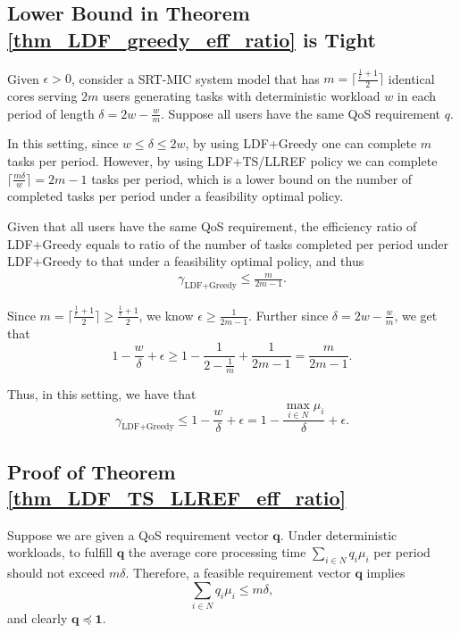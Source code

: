 \documentclass[prodmode,acmtompecs]{acmsmall}
\newcommand{\reqvec}{\mathbf{q}}
\newcommand{\reqscalar}{q}
\newcommand{\fullUserSet}{N}
\begin{document}
\subsection{Lower Bound in Theorem \ref{thm_LDF_greedy_eff_ratio} is Tight}
\label{appendix_example_showing_theorem_LDF_Greedy_eff_ratio_is_tight}
Given $\epsilon > 0$, consider a SRT-MIC system model that has $m = \lceil \frac{\frac{1}{\epsilon} + 1}{2} \rceil$ identical cores serving $2m$ users generating tasks with deterministic workload $w$ in each period of length $\delta = 2w - \frac{w}{m}$. Suppose all users have the same QoS requirement $\reqscalar$. 

In this setting, since $w \leq \delta \leq 2w$, by using LDF+Greedy one can complete $m$ tasks per period. However, by using LDF+TS/LLREF policy we can complete $\lceil \frac{m\delta}{w} \rceil = 2m-1$ tasks per period, which is a lower bound on the number of completed tasks per period under a feasibility optimal policy. 

Given that all users have the same QoS requirement, the efficiency ratio of LDF+Greedy equals to ratio of the number of tasks completed per period under LDF+Greedy to that under a feasibility optimal policy, and thus
\begin{align*}
\gamma_{\text{LDF+Greedy}} \leq \frac{m}{2m-1}.  
\end{align*}

Since $m = \lceil \frac{\frac{1}{\epsilon} + 1}{2} \rceil \geq \frac{\frac{1}{\epsilon} + 1}{2}$, we know $\epsilon \geq \frac{1}{2m-1}$. Further since $\delta = 2w - \frac{w}{m}$, we get that
$$
1 - \frac{w}{\delta} + \epsilon \geq 1 - \frac{1}{2 - \frac{1}{m}} + \frac{1}{2m-1} = \frac{m}{2m-1}. 
$$

Thus, in this setting, we have that
$$
\gamma_{\text{LDF+Greedy}} \leq 1 - \frac{w}{\delta} + \epsilon = 1 - \frac{\max\limits_{i\in \fullUserSet} \mu_i}{\delta} + \epsilon. 
$$

\subsection{Proof of Theorem \ref{thm_LDF_TS_LLREF_eff_ratio}}
\label{appendix_pf_thm_LDF_TS_LLREF_eff_ratio}
Suppose we are given a QoS requirement vector $\reqvec$. Under deterministic workloads, to fulfill $\reqvec$ the average core processing time $\sum\limits_{i\in \fullUserSet} \reqscalar_i\mu_i$ per period should not exceed $m
\delta$. Therefore, a feasible requirement vector $\reqvec$ implies 
$$
\sum\limits_{i\in \fullUserSet} \reqscalar_i \mu_i \leq m\delta, 
$$
and clearly $\reqvec \preceq \mathbf{1}$. 
\end{document}
